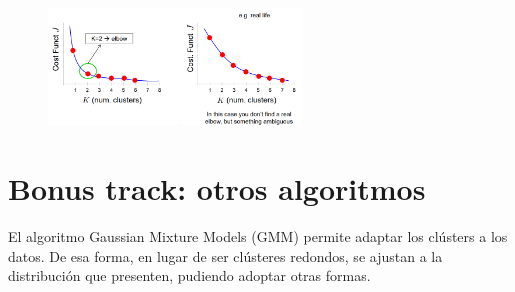 \begin{figure}[h]
\centering
\includegraphics[width = 0.6\textwidth]{figs/kmeans-k.png}
\end{figure}

\section{Bonus track: otros algoritmos}
El algoritmo Gaussian Mixture Models (GMM) permite adaptar los clústers a los datos. De esa forma, en lugar de ser clústeres redondos, se ajustan a la distribución que presenten, pudiendo adoptar otras formas. 